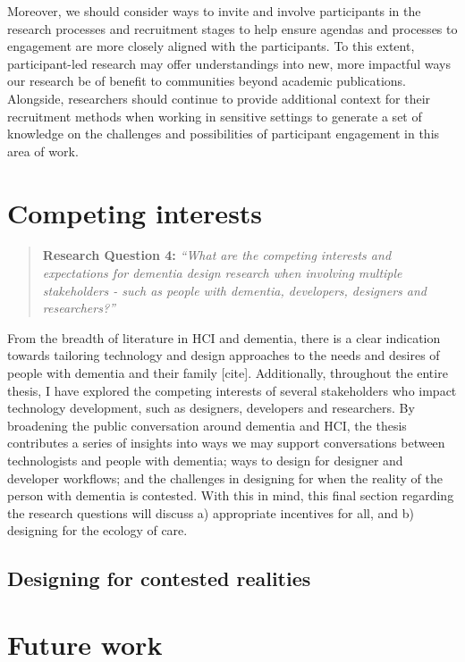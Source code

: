 Moreover, we should consider ways to invite and involve participants in the research processes and recruitment stages to help ensure agendas and processes to engagement are more closely aligned with the participants. To this extent, participant-led research may offer understandings into new, more impactful ways our research be of benefit to communities beyond academic publications. Alongside, researchers should continue to provide additional context for their recruitment methods when working in sensitive settings to generate a set of knowledge on the challenges and possibilities of participant engagement in this area of work.

\section{Competing interests}
\label{Discussion:RQ4}
\begin{quote}
\textbf{    Research Question 4:
}    
\textit{    “What are the competing interests and expectations for dementia design research when involving multiple stakeholders - such as people with dementia, developers, designers and researchers?”}
\end{quote}
From the breadth of literature in HCI and dementia, there is a clear indication towards tailoring technology and design approaches to the needs and desires of people with dementia and their family [cite]. Additionally, throughout the entire thesis, I have explored the competing interests of several stakeholders who impact technology development, such as designers, developers and researchers. By broadening the public conversation around dementia and HCI, the thesis contributes a series of insights into ways we may support conversations between technologists and people with dementia; ways to design for designer and developer workflows; and the challenges in designing for when the reality of the person with dementia is contested. With this in mind, this final section regarding the research questions will discuss a) appropriate incentives for all, and  b) designing for the ecology of care. 

\subsection{Designing for contested realities}
\label{RQ4:ContestedRealities}

\section{Future work}
\label{FutureWork}

